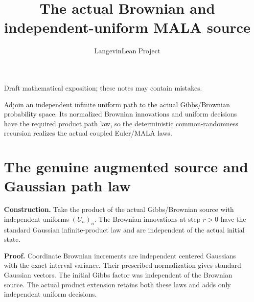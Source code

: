 \documentclass[11pt,a4paper]{article}
\title{\texorpdfstring{The actual Brownian and independent-uniform MALA source}{The actual Brownian and independent-uniform MALA source}}
\author{LangevinLean Project}
\date{}
\begin{document}
\maketitle
Draft mathematical exposition; these notes may contain mistakes.


Adjoin an independent infinite uniform path to the actual Gibbs/\allowbreak{}Brownian probability space. Its normalized Brownian innovations and uniform decisions have the required product path law, so the deterministic common-randomness recursion realizes the actual coupled Euler/\allowbreak{}MALA laws.


\section{\texorpdfstring{The genuine augmented source and Gaussian path law}{The genuine augmented source and Gaussian path law}}


\textbf{Construction.} Take the product of the actual Gibbs/\allowbreak{}Brownian source with independent uniforms \((U_n)_n\). The Brownian innovations at step \(r>0\) have the standard Gaussian infinite-product law and are independent of the actual initial state.



\textbf{Proof.} Coordinate Brownian increments are independent centered Gaussians with the exact interval variance. Their prescribed normalization gives standard Gaussian vectors. The initial Gibbs factor was independent of the Brownian source. The actual product extension retains both these laws and adds only independent uniform decisions.
\end{document}
